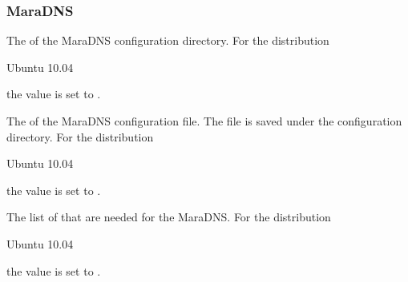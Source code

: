 \subsubsection*{MaraDNS}


The  of the MaraDNS configuration directory.
For the distribution
\begin{inparaitem}
\item[\TheDistribution{ubuntu}] Ubuntu 10.04
\end{inparaitem}
the value is set to .


The  of the MaraDNS configuration file. The file is saved
under the configuration directory.
For the distribution
\begin{inparaitem}
\item[\TheDistribution{ubuntu}] Ubuntu 10.04
\end{inparaitem}
the value is set to .


The list of  that are needed for the MaraDNS.
For the distribution
\begin{inparaitem}
\item[\TheDistribution{ubuntu}] Ubuntu 10.04
\end{inparaitem}
the value is set to .

